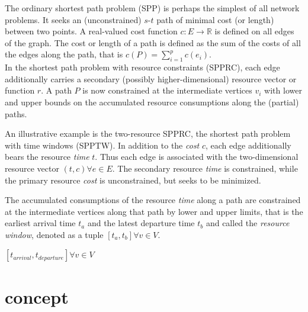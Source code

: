 The ordinary shortest path problem (SPP) is perhaps the simplest of all network problems. It seeks an (unconstrained) $s$-$t$ path of minimal cost (or length) between two points. A real-valued cost function $c : E \rightarrow \mathbb{R}$ is defined on all edges of the graph. The cost or length of a path is defined as the sum of the costs of all the edges along the path, that is $c(P)=\sum_{i=1}^p c(e_i)$. \\



In the shortest path problem with resource constraints (SPPRC), each edge additionally carries a secondary (possibly higher-dimensional) resource vector or function $r$. A path $P$ is now constrained at the intermediate vertices $v_i$ with lower and upper bounds on the accumulated resource consumptions along the (partial) paths.\\

\begin{example}[SPPTW]
An illustrative example is the two-resource SPPRC, the shortest path problem with time windows (SPPTW). In addition to the \textit{cost} $c$, each edge additionally bears the resource \textit{time} $t$. Thus each edge is associated with the two-dimensional resource vector $(t,c) \forall e \in E$. The secondary resource \textit{time} is constrained, while the primary resource \textit{cost} is unconstrained, but seeks to be minimized.

The accumulated consumptions of the resource \textit{time} along a path are constrained at the intermediate vertices along that path by lower and upper limits, that is the earliest arrival time $t_a$ and the latest departure time $t_b$ and called the \textit{resource window}, denoted as a tuple $[t_a,t_b] \forall v \in V$.
\end{example}

$[t_{arrival},t_{departure}] \forall v \in V$


\section{}



\section{concept}

